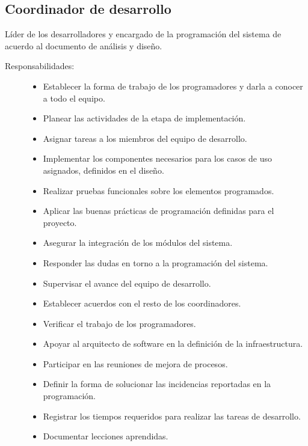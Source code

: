 \subsection{Coordinador de desarrollo}
	Líder de los desarrolladores y encargado de la programación del sistema de acuerdo al documento de análisis y diseño.
\begin{description}
	\item[Responsabilidades:] \cdtEmpty 	
    \begin{itemize}
    	\item Establecer la forma de trabajo de los programadores y darla a conocer a todo el equipo.
    	\item Planear las actividades de la etapa de implementación.
    	\item Asignar tareas a los miembros del equipo de desarrollo.
    	\item Implementar los componentes necesarios para los casos de uso asignados, definidos en el diseño.
    	\item Realizar pruebas funcionales sobre los elementos programados.
    	\item Aplicar las buenas prácticas de programación definidas para el proyecto.
    	\item Asegurar la integración de los módulos del sistema.
    	\item Responder las dudas en torno a la programación del sistema.
    	\item Supervisar el avance del equipo de desarrollo.
    	\item Establecer acuerdos con el resto de los coordinadores.
    	\item Verificar el trabajo de los programadores.
    	\item Apoyar al arquitecto de software en la definición de la infraestructura.
    	\item Participar en las reuniones de mejora de procesos.
    	\item Definir la forma de solucionar las incidencias reportadas en la programación.
    	\item Registrar los tiempos requeridos para realizar las tareas de desarrollo.
    	\item Documentar lecciones aprendidas.
    \end{itemize}
\end{description}

